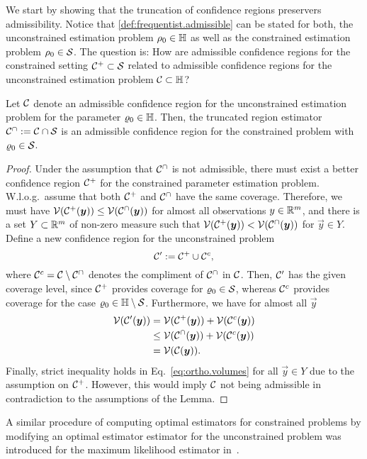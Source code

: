 We start by showing that the truncation of confidence regions preservers admissibility.
Notice that \cref{def:frequentist.admissible} can be stated for both, the unconstrained estimation problem $\rho_0 \in \mathbb{H}$ as well as the constrained estimation problem $\rho_0 \in \mathcal{S}$.
The question is: How are admissible confidence regions for the constrained setting $\mathcal{C}^+\subset\mathcal{S}$ related to admissible confidence regions for the unconstrained estimation problem $\mathcal{C}\subset\mathbb{H}$?
\begin{lemma}\label{lem:ortho.admissible_truncation}
  Let $\mathcal{C}$ denote an admissible confidence region for the unconstrained estimation problem for the parameter $\varrho_0 \in \mathbb{H}$.
  Then, the truncated region estimator $\mathcal{C}^\cap := \mathcal{C}\cap\mathcal{S}$ is an admissible confidence region for the constrained problem with $\varrho_0 \in \mathcal{S}$.
\end{lemma}
\begin{proof}
  Under the assumption that $\mathcal{C}^\cap$ is not admissible, there must exist a better confidence region $\mathcal{C}^+$ for the constrained parameter estimation problem.
  W.l.o.g.\ assume that both $\mathcal{C}^+$ and $\mathcal{C}^\cap$ have the same coverage.
  Therefore, we must have $\mathcal{V}(\mathcal{C}^+(\boldsymbol{y})) \leq \mathcal{V}(\mathcal{C}^\cap(\boldsymbol{y}))$ for almost all observations $y \in \mathbb{R}^m$, and there is a set $Y \subset \mathbb{R}^m$ of non-zero measure such that $\mathcal{V}(\mathcal{C}^+(\boldsymbol{y})) < \mathcal{V}(\mathcal{C}^\cap(\boldsymbol{y}))$ for $\vec y \in Y$.
  Define a new confidence region for the unconstrained problem
  \[
    \mathcal{C}' := \mathcal{C}^+ \cup \mathcal{C}^c,
    \label{eq:ortho.new_region}
  \]
  where $\mathcal{C}^{c}=\mathcal{C}\setminus \mathcal{C}^{\cap}$ denotes the compliment of $\mathcal{C}^{\cap}$ in $\mathcal{C}$.
  Then, $\mathcal{C}'$ has the given coverage level, since $\mathcal{C}^+$ provides coverage for $\varrho_0 \in \mathcal{S}$, whereas $\mathcal{C}^c$ provides coverage for the case $\varrho_0 \in \mathbb{H} \setminus \mathcal{S}$.
  Furthermore, we have for almost all $\vec y$
  \[
    \label{eq:ortho.volumes}
    \begin{split}
      \mathcal{V}(\mathcal{C}'(\boldsymbol{y}))
      &= \mathcal{V}(\mathcal{C}^+(\boldsymbol{y})) + \mathcal{V}(\mathcal{C}^c(\boldsymbol{y})) \\
      &\leq \mathcal{V}(\mathcal{C}^\cap(\boldsymbol{y})) + \mathcal{V}(\mathcal{C}^c(\boldsymbol{y})) \\
      &= \mathcal{V}(\mathcal{C}(\boldsymbol{y})).
    \end{split}
  \]
  Finally, strict inequality holds in Eq.~\eqref{eq:ortho.volumes} for all $\vec y \in Y$ due to the assumption on $\mathcal{C}^+$.
  However, this would imply $\mathcal{C}$ not being admissible in contradiction to the assumptions of the Lemma.
\end{proof}
A similar procedure of computing optimal estimators for constrained problems by modifying an optimal estimator estimator for the unconstrained problem was introduced for the maximum likelihood estimator in~\cite{Smolin_2012_Maximum}.\\



